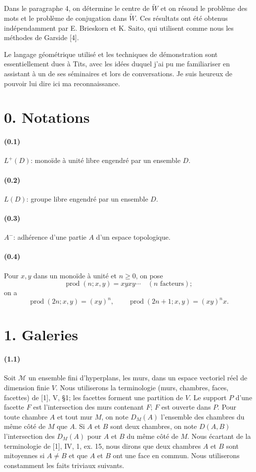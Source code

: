 \documentclass[10pt,a4paper]{article}
\newcommand{\prodalt}{\operatorname{prod}}
\newcommand{\cl}[1]{{#1}^{-}}
\newcommand{\mcA}{\mathcal M}
\begin{document}
Dans le paragraphe 4, on détermine le centre de $\widetilde W$ et on résoud le problème des mots et le problème de conjugation dans $\widetilde W$. Ces résultats ont été obtenus indépendamment par E. Brieskorn et K. Saito, qui utilisent comme nous les méthodes de Garside [4].

Le langage géométrique utilisé et les techniques de démonstration sont essentiellement dues à Tits, avec les idées duquel j'ai pu me familiariser en assistant à un de ses séminaires et lors de conversations. Je suis heureux de pouvoir lui dire ici ma reconnaissance.

\section*{0. Notations}

\paragraph{(0.1)} $L^+(D)$: monoïde à unité libre engendré par un ensemble $D$.

\paragraph{(0.2)} $L(D)$: groupe libre engendré par un ensemble $D$.

\paragraph{(0.3)} $\cl A$: adhérence d'une partie $A$ d'un espace topologique.

\paragraph{(0.4)} Pour $x,y$ dans un monoïde à unité et $n\ge0$, on pose
\[
\prodalt(n;x,y)=xyxy\cdots\quad (n\text{ facteurs});
\]
on a
\[
\prodalt(2n;x,y)=(xy)^n,\qquad
\prodalt(2n+1;x,y)=(xy)^nx.
\]

\section*{1. Galeries}

\paragraph{(1.1)} Soit $\mcA$ un ensemble fini d'hyperplans, les murs, dans un espace vectoriel réel de dimension finie $V$. Nous utiliserons la terminologie (murs, chambres, faces, facettes) de [1], V, §1; les facettes forment une partition de $V$. Le support $P$ d'une facette $F$ est l'intersection des murs contenant $F$; $F$ est ouverte dans $P$. Pour toute chambre $A$ et tout mur $M$, on note $D_M(A)$ l'ensemble des chambres du même côté de $M$ que $A$. Si $A$ et $B$ sont deux chambres, on note $D(A,B)$ l'intersection des $D_M(A)$ pour $A$ et $B$ du même côté de $M$. Nous écartant de la terminologie de [1], IV, 1, ex. 15, nous dirons que deux chambres $A$ et $B$ sont mitoyennes si $A\ne B$ et que $A$ et $B$ ont une face en commun. Nous utiliserons constamment les faits triviaux suivants.
\end{document}
